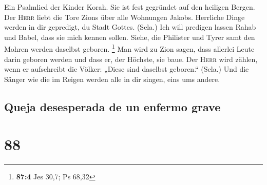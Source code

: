  Ein Psalmlied der Kinder Korah. Sie ist fest gegründet
auf den heiligen Bergen.  Der \textsc{Herr} liebt die Tore
Zions über alle Wohnungen Jakobs.  Herrliche Dinge werden
in dir gepredigt, du Stadt Gottes. (Sela.)  Ich will
predigen lassen Rahab und Babel, dass sie mich kennen sollen. Siehe, die
Philister und Tyrer samt den Mohren werden daselbst geboren. \footnote{\textbf{87:4}
  Jes 30,7; Ps 68,32}  Man wird zu Zion sagen, dass
allerlei Leute darin geboren werden und dass er, der Höchste, sie baue.
 Der \textsc{Herr} wird zählen, wenn er aufschreibt die
Völker: „Diese sind daselbst geboren.`` (Sela.)  Und die
Sänger wie die im Reigen werden alle in dir singen, eins ums andere.

\hypertarget{queja-desesperada-de-un-enfermo-grave}{%
\subsection{Queja desesperada de un enfermo
grave}\label{queja-desesperada-de-un-enfermo-grave}}

\hypertarget{section-87}{%
\section{88}\label{section-87}}

